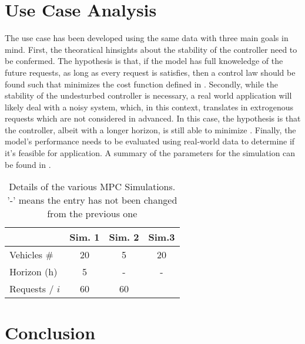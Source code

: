 \section{Use Case Analysis}\label{sec:use_case_mpc}
The use case has been developed using the same data  with three main goals in mind. First, the theoratical hinsights about the stability of the controller need to be confermed. The hypothesis is that, if the model has full knoweledge of the future requests, as long as every request is satisfies, then a control law should be found such that minimizes the cost function defined in . Secondly, while the stability of the undesturbed controller is necessary, a real world application will likely deal with a noisy system, which, in this context, translates in extrogenous requests which are not considered in advanced. In this case, the hypothesis is that the controller, albeit with a longer horizon, is still able to minimize . Finally, the model's performance needs to be evaluated using real-world data to determine if it's feasible for application. A summary of the parameters for the simulation can be found in .  

\begin{table}[h]
	\centering
	\begin{tabular}{ |l| c|c|c|}
		\hline
		&Sim. 1 & Sim. 2& Sim.3\\
		\hline
		Vehicles \#& 20&5&20\\
		Horizon (h) & 5 &- &-\\
		Requests / $i$ & 60&60&\\
	\end{tabular}
	\caption[Details of the various MPC Simulations]{Details of the various MPC Simulations. '-' means the entry has not been changed from the previous one}
	\label{tab:mpc_simu}   
\end{table} 

\section{Conclusion}